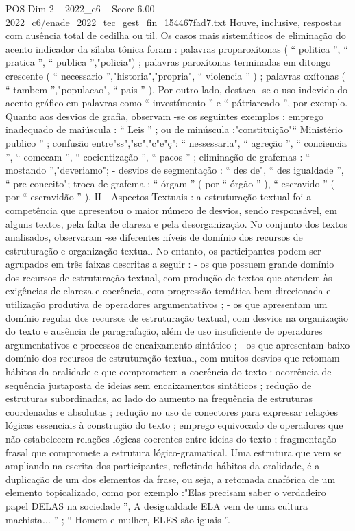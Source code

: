 \begin{textsample}{POS Dim 2 – 2022\_c6 – Score 6.00 – 2022\_c6/enade\_2022\_tec\_gest\_fin\_154467fad7.txt}
Houve, inclusive, respostas com ausência total de cedilha ou til.
Os casos mais sistemáticos de eliminação do acento indicador da sílaba tônica foram : palavras proparoxítonas ( “ politica ”, “ pratica ”, “ publica ”,"policia") ; palavras paroxítonas terminadas em ditongo crescente ( “ necessario ”,"historia","propria", “ violencia ” ) ; palavras oxítonas ( “ tambem ”,"populacao", “ pais ” ).
Por outro lado, destaca -se o uso indevido do acento gráfico em palavras como “ investímento ” e “ pátriarcado ”, por exemplo.
Quanto aos desvios de grafia, observam -se os seguintes exemplos : emprego inadequado de maiúscula : “ Leis ” ; ou de minúscula :"constituição"“ Ministério publico ” ; confusão entre"ss","sc","c"e"ç": “ nessessaria", “ agreção ”, “ conciencia ”, “ comecam ”, “ cocientização ”, “ pacos ” ; eliminação de grafemas : “ mostando ”,"deveriamo"; - desvios de segmentação : “ des de", “ des igualdade ”, “ pre conceito"; troca de grafema : “ órgam ” ( por “ órgão ” ), “ escravido ” ( por “ escravidão ” ).
II - Aspectos Textuais : a estruturação textual foi a competência que apresentou o maior número de desvios, sendo responsável, em alguns textos, pela falta de clareza e pela desorganização.
No conjunto dos textos analisados, observaram -se diferentes níveis de domínio dos recursos de estruturação e organização textual.
No entanto, os participantes podem ser agrupados em três faixas descritas a seguir : - os que possuem grande domínio dos recursos de estruturação textual, com produção de textos que atendem às exigências de clareza e coerência, com progressão temática bem direcionada e utilização produtiva de operadores argumentativos ; - os que apresentam um domínio regular dos recursos de estruturação textual, com desvios na organização do texto e ausência de paragrafação, além de uso insuficiente de operadores argumentativos e processos de encaixamento sintático ; - os que apresentam baixo domínio dos recursos de estruturação textual, com muitos desvios que retomam hábitos da oralidade e que comprometem a coerência do texto : ocorrência de sequência justaposta de ideias sem encaixamentos sintáticos ; redução de estruturas subordinadas, ao lado do aumento na frequência de estruturas coordenadas e absolutas ; redução no uso de conectores para expressar relações lógicas essenciais à construção do texto ; emprego equivocado de operadores que não estabelecem relações lógicas coerentes entre ideias do texto ; fragmentação frasal que compromete a estrutura lógico-gramatical.
Uma estrutura que vem se ampliando na escrita dos participantes, refletindo hábitos da oralidade, é a duplicação de um dos elementos da frase, ou seja, a retomada anafórica de um elemento topicalizado, como por exemplo :"Elas precisam saber o verdadeiro papel DELAS na sociedade ”, A desigualdade ELA vem de uma cultura machista... ” ; “ Homem e mulher, ELES são iguais ”.

\end{textsample}
